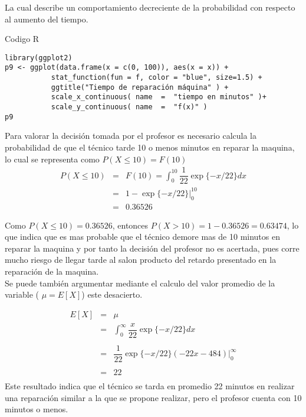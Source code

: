 \documentclass[base=hide,12pt]{elegantbook}
\begin{document}
La cual describe un comportamiento decreciente de la probabilidad con respecto al aumento del tiempo.\\

{\small
\begin{Box3}{Codigo R}
\begin{verbatim}
library(ggplot2)	
p9 <- ggplot(data.frame(x = c(0, 100)), aes(x = x)) +
           stat_function(fun = f, color = "blue", size=1.5) +
           ggtitle("Tiempo de reparación máquina" ) +
           scale_x_continuous( name  =  "tiempo en minutos" )+
           scale_y_continuous( name  =  "f(x)" ) 
p9	
\end{verbatim}
\end{Box3}	
}

Para valorar la decisión tomada por el profesor es necesario calcula la probabilidad de que el técnico tarde 10 o menos minutos en reparar la maquina, lo cual se representa como $P(X \leq 10) =F(10)$ \\

\begin{eqnarray*}
	P(X \leq 10) &=& F(10) = \int_{0}^{10} \dfrac{1}{22} \exp\{-x/22\} dx \\
	&=& 1-\exp\{-x/22\} \Bigg|_{0}^{10}   \\
	&=& 0.36526
\end{eqnarray*}

Como $P(X \leq 10) = 0.36526$, entonces $P(X>10) =1-0.36526 = 0.63474 $, lo que indica que es mas probable que el técnico demore mas de 10 minutos en reparar la maquina y por tanto la decisión del profesor no es acertada, pues corre mucho riesgo de llegar tarde al salon producto del retardo presentado en la reparación de la maquina. \\

Se puede también argumentar mediante el calculo del valor promedio de la variable ( $\mu= E[X]$) este desacierto.


\begin{eqnarray*}
	E[X] & = & \mu \\
	     & = & \int_{0}^{\infty} \dfrac{x}{22} \exp\{-x/22\} dx\\
	     &&\\
	     & = & \dfrac{1}{22} \exp\{-x/22\} (-22x-484) \Big|_{0}^{\infty}\\
	     &&\\
	     & = & 22 \\
\end{eqnarray*}
%
Este resultado indica que el técnico se tarda en promedio 22 minutos en realizar una reparación similar a la que se propone realizar, pero el  profesor cuenta con 10 minutos o menos.\\
\end{document}
